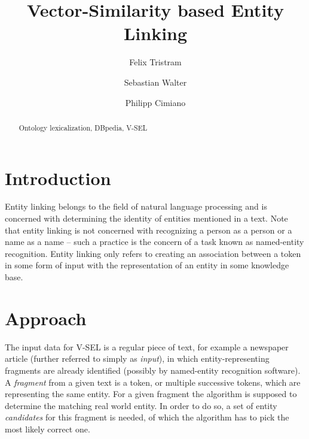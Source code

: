 \documentclass[runningheads,a4paper]{llncs}
\newcommand{\keywords}[1]{\par\addvspace\baselineskip
\noindent\keywordname\enspace\ignorespaces#1}
\begin{document}
\mainmatter  %

\newcommand{\acronym}{V-SEL}



\title{Vector-Similarity based Entity Linking}

\author{Felix Tristram \and Sebastian Walter \and Philipp Cimiano}



\maketitle


\begin{abstract}


\keywords{Ontology lexicalization, DBpedia, \acronym{}}
\end{abstract}

\section{Introduction}\label{sec:introduction}
Entity linking belongs to the field of natural language processing and is concerned with determining the identity of entities mentioned in a text. Note that entity linking is not concerned with recognizing a person as a person or a name as a name -- such a practice is the concern of a task known as named-entity recognition. Entity linking only refers to creating an association between a token in some form of input with the representation of an entity in some knowledge base.



\section{Approach}\label{sec:approach}
The input data for {\acronym} is a regular piece of text, for example a newspaper article (further referred to simply as \textit{input}), in which entity-representing fragments are already identified (possibly by named-entity recognition software). A \textit{fragment} from a given text is a token, or multiple successive tokens, which are representing the same entity. For a given fragment the algorithm is supposed to determine the matching real world entity. In order to do so, a set of entity \textit{candidates} for this fragment is needed, of which the algorithm has to pick the most likely correct one. 
\end{document}
